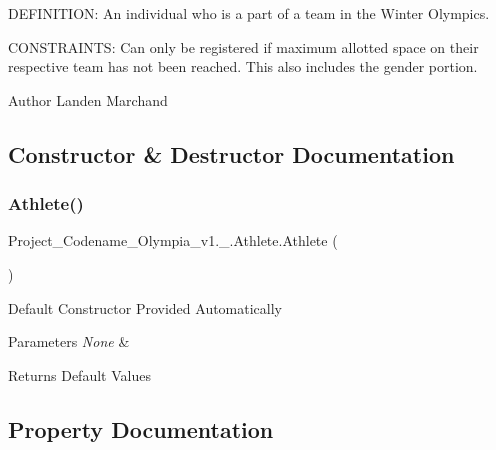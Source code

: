 D\+E\+F\+I\+N\+I\+T\+I\+ON\+: An individual who is a part of a team in the Winter Olympics.

C\+O\+N\+S\+T\+R\+A\+I\+N\+TS\+: Can only be registered if maximum allotted space on their respective team has not been reached. This also includes the gender portion.\begin{DoxyAuthor}{Author}
Landen Marchand 
\end{DoxyAuthor}


\subsection{Constructor \& Destructor Documentation}
\mbox{\label{classProject__Codename__Olympia__v1_1_1__0_1_1Athlete_a9f7a395fab9d43787087a2041a4b7507}} 
\subsubsection{\texorpdfstring{Athlete()}{Athlete()}}
{\footnotesize\ttfamily Project\+\_\+\+Codename\+\_\+\+Olympia\+\_\+v1.\+\_.\+Athlete.\+Athlete (\begin{DoxyParamCaption}{ }\end{DoxyParamCaption})\hspace{0.3cm}{\ttfamily [inline]}}

Default Constructor Provided Automatically 
\begin{DoxyParams}{Parameters}
{\em None} & \\
\hline
\end{DoxyParams}
\begin{DoxyReturn}{Returns}
Default Values 
\end{DoxyReturn}


\subsection{Property Documentation}
\mbox{\label{classProject__Codename__Olympia__v1_1_1__0_1_1Athlete_a2aff06b4778db2b8c2574b68cfdca6b6}} 
